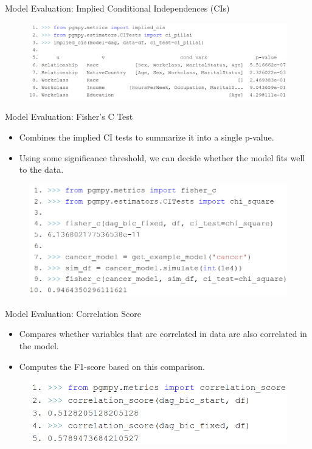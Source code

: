 \documentclass[aspectratio=169]{beamer}
\begin{document}
\begin{frame}{Model Evaluation: Implied Conditional Independences (CIs)}
	\begin{figure}
		\includegraphics[scale=0.27]{imgs/implied_cis.png}
	\end{figure}
\end{frame}

\begin{frame}{Model Evaluation: Fisher's C Test}
	\begin{itemize}
		\item Combines the implied CI tests to summarize it into a single p-value.
		\item Using some significance threshold, we can decide whether the model fits well to the data.
	\end{itemize}
	\vspace{2em}
	\begin{figure}
		\centering
		\includegraphics[scale=0.3]{imgs/fisherc.png}
	\end{figure}
\end{frame}

\begin{frame}{Model Evaluation: Correlation Score}
	\begin{itemize}
		\item Compares whether variables that are correlated in data
			are also correlated in the model.
		\item Computes the F1-score based on this comparison.
	\end{itemize}
	\vspace{2em}
	\begin{figure}
		\centering
		\includegraphics[scale=0.3]{imgs/corr_score.png}
	\end{figure}

\end{frame}
\end{document}
